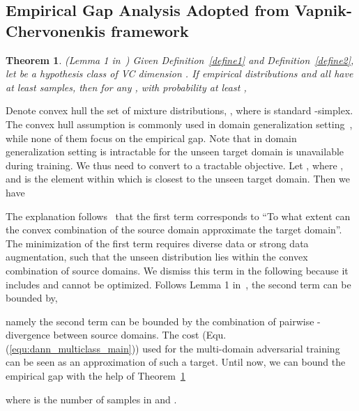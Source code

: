 \documentclass{article} \usepackage{iclr2023_conference,times}
\newtheorem{theo}{Theorem}
\newcommand{\myref}[1]{Equ. (\ref{#1})}
\begin{document}
\subsection{Empirical Gap Analysis Adopted from Vapnik-Chervonenkis framework}\label{sec:empirical_vc}
\begin{theo}
(Lemma 1 in~\citep{ben2010theory}) Given Definition~\ref{define1} and Definition~\ref{define2}, let  be a hypothesis class of VC dimension . If empirical distributions  and  all have at least  samples, then for any , with probability at least ,

\label{theo:empirical_dann}
\end{theo}

Denote convex hull  the set of mixture distributions, , where  is standard -simplex. The convex hull assumption is commonly used in domain generalization setting~\citep{zhang2021towards,albuquerque2020generalizing}, while none of them focus on the empirical gap. Note that  in domain generalization setting is intractable for the unseen target domain  is unavailable during training. We thus need to convert  to a tractable objective. Let , where , and  is the element within  which is closest to the unseen target domain. Then we have 

The explanation follows~\citep{zhang2021towards} that the first term corresponds to “To what extent can the convex combination of the source domain approximate the target domain”. The minimization of the first term requires diverse data or strong data augmentation, such that the unseen distribution lies within the convex combination of source domains. We dismiss this term in the following because it includes  and cannot be optimized.
Follows Lemma 1 in~\citep{albuquerque2020generalizing}, the second term can be bounded by,

namely the second term can be bounded by the combination of pairwise -divergence between source domains. The cost (\myref{equ:dann_multiclass_main}) used for the multi-domain adversarial training can be seen as an approximation of such a target. Until now, we can bound the empirical gap with the help of Theorem~\ref{theo:empirical_dann}

where  is the number of samples in  and . 
\end{document}
